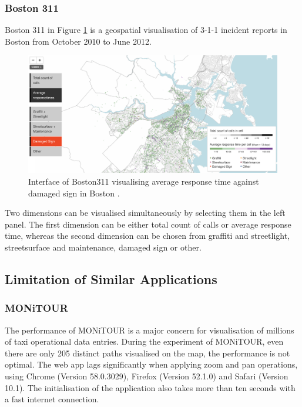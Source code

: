 \documentclass[11pt,a4paper]{article}
\begin{document}
\subsubsection{Boston 311}\label{sec:boston311}
Boston 311 \parencite{Boston311} in Figure \ref{fig:10} is a geospatial visualisation of 3-1-1 incident reports in Boston from October 2010 to June 2012. 
\begin{figure}[H]
	\centering
	\includegraphics[width=\textwidth,keepaspectratio]{figures/fig10.png}
	\caption{\label{fig:10}Interface of Boston311 visualising average response time against damaged sign in Boston \parencite{Boston311}.}
\end{figure}

Two dimensions can be visualised simultaneously by selecting them in the left panel. The first dimension can be either total count of calls or average response time, whereas the second dimension can be chosen from graffiti and streetlight, streetsurface and maintenance, damaged sign or other.

\subsection{Limitation of Similar Applications}
\subsubsection{MONiTOUR}
The performance of MONiTOUR is a major concern for visualisation of millions of taxi operational data entries. During the experiment of MONiTOUR, even there are only 205 distinct paths visualised on the map, the performance is not optimal. The web app lags significantly when applying zoom and pan operations, using Chrome (Version 58.0.3029), Firefox (Version 52.1.0) and Safari (Version 10.1). The initialisation of the application also takes more than ten seconds with a fast internet connection.
\end{document}
